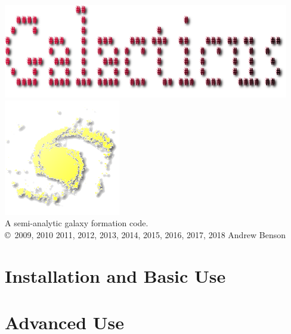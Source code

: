 \documentclass[letterpaper,10pt,headsepline]{scrbook}
\begin{document}
\lstset{language=[95]Fortran}

\frontmatter

\pagestyle{empty}
\begin{center}
\includegraphics[width=125mm]{GalacticusLogo.png}\\

\includegraphics{New_Logo_Galaxy_192_Transparent.png}\\
A semi-analytic galaxy formation code.\\

\copyright\ 2009, 2010 2011, 2012, 2013, 2014, 2015, 2016, 2017, 2018 Andrew Benson
\end{center}

\tableofcontents

\mainmatter
\pagestyle{headings}

\part{Installation and Basic Use}



















\part{Advanced Use}
\end{document}
